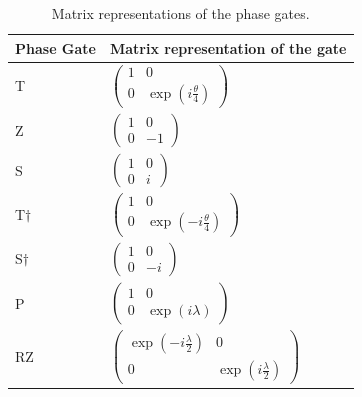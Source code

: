 \begin{table}[]
\label{tab:pgates}
\caption{Matrix representations of the phase gates.}
        \begin{tabular}{l|l}
        \hline
        \multicolumn{1}{|l|}{Phase Gate}  & \multicolumn{1}{l|}{Matrix representation of the gate}               \\ \hline
        T                                 & $\begin{pmatrix}1&0 \\ 0& \exp(i\frac{\theta}{4})\end{pmatrix}$      \\
        Z                                 & $\begin{pmatrix}1&0 \\ 0& -1\end{pmatrix}$                           \\
        S                                 & $\begin{pmatrix}1&0 \\ 0& i\end{pmatrix}$                            \\
        T$\dagger$                        & $\begin{pmatrix}1&0 \\ 0& \exp(-i\frac{\theta}{4})\end{pmatrix}$     \\
        S$\dagger $                       & $\begin{pmatrix}1&0 \\ 0& -i\end{pmatrix}$                           \\
        P                                 & $\begin{pmatrix}1&0 \\ 0& \exp(i\lambda)\end{pmatrix}$               \\
        RZ                                & $\begin{pmatrix}\exp(-i\frac{\lambda}{2})&0 \\ 0& \exp(i\frac{\lambda}{2})\end{pmatrix}$                                    
        \end{tabular} 
\end{table}
    
